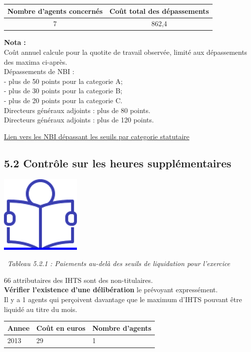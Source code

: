 \begin{longtable}[]{@{}cc@{}}
\toprule
Nombre d'agents concernés & Coût total des dépassements\tabularnewline
\midrule
\endhead
7 & 862,4\tabularnewline
\bottomrule
\end{longtable}

\textbf{Nota :}\\
Coût annuel calcule pour la quotite de travail observée, limité aux
dépassements des maxima ci-après.\\
Dépassements de NBI :\\
- plus de 50 points pour la categorie A;\\
- plus de 30 points pour la categorie B;\\
- plus de 20 points pour la categorie C.\\
Directeurs généraux adjoints : plus de 80 points.\\
Directeurs généraux adjoints : plus de 120 points.

\href{../Bases/Reglementation/NBI.cat.irreg.csv}{Lien vers les NBI
dépassant les seuils par categorie statutaire}

\hypertarget{controle-sur-les-heures-supplementaires}{%
\subsection{5.2 Contrôle sur les heures
supplémentaires}\label{controle-sur-les-heures-supplementaires}}

\href{../Docs/Notices/fiche_IHTS.odt}{\includegraphics{icones/Notice.png}}

~\emph{Tableau 5.2.1 : Paiements au-delà des seuils de liquidation pour
l'exercice}

66 attributaires des IHTS sont des non-titulaires.\\
\textbf{Vérifier l'existence d'une délibération} le prévoyant
expressément.\\
Il y a 1 agents qui perçoivent davantage que le maximum d'IHTS pouvant
être liquidé au titre du mois.

\begin{longtable}[]{@{}lll@{}}
\toprule
Annee & Coût en euros & Nombre d'agents\tabularnewline
\midrule
\endhead
2013 & 29 & 1\tabularnewline
\bottomrule
\end{longtable}

